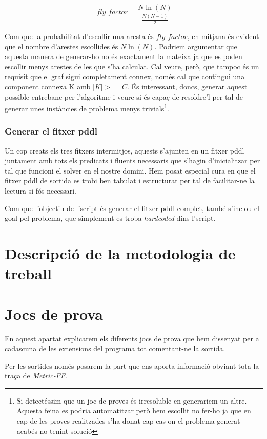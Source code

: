 \documentclass[11pt,a4paper]{article}
\begin{document}
\[
\ fly\_factor = \frac{N \ln(N)}{\frac{N (N-1)}{2}}
\]

Com que la probabilitat d'escollir una aresta és $fly\_factor$, en mitjana és evident que el nombre d'arestes escollides és $N\ln(N)$. Podriem argumentar que aquesta manera de generar-ho no és exactament la mateixa ja que es poden escollir menys arestes de les que s'ha calculat. Cal veure, però, que tampoc és un requisit que el graf sigui completament connex, només cal que contingui una component connexa K amb $|K| >= C$. És interessant, doncs, generar aquest possible entrebanc per l'algoritme i veure si és capaç de resoldre'l per tal de generar unes instàncies de problema menys trivials\footnote{Si detectéssim que un joc de proves és irresoluble en generariem un altre. Aquesta feina es podria automatitzar però hem escollit no fer-ho ja que en cap de les proves realitzades s'ha donat cap cas on el problema generat acabés no tenint solució}.

\subsubsection*{Generar el fitxer pddl}

Un cop creats els tres fitxers intermitjos, aquests s'ajunten en un fitxer pddl juntament amb tots els predicats i fluents necessaris que s'hagin d'inicialitzar per tal que funcioni el solver en el nostre domini. Hem posat especial cura en que el fitxer pddl de sortida es trobi ben tabulat i estructurat per tal de facilitar-ne la lectura si fós necessari.

Com que l'objectiu de l'script és generar el fitxer pddl complet, també s'inclou el goal pel problema, que simplement es troba \emph{hardcoded} dins l'script.

\section{Descripció de la metodologia de treball}


\section{Jocs de prova}

En aquest apartat explicarem els diferents jocs de prova que hem dissenyat per a cadascuna de les extensions del programa tot comentant-ne la sortida.

Per les sortides només posarem la part que ens aporta informació obviant tota la traça de \emph{Metric-FF}. 
\end{document}
